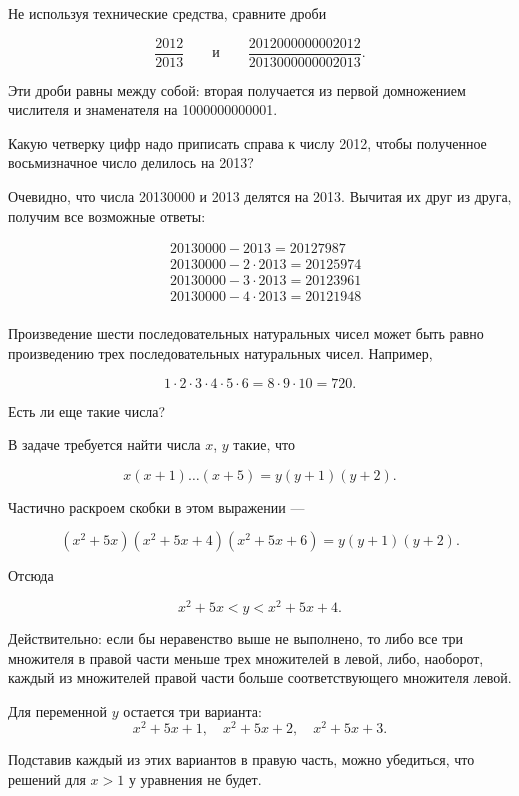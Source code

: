 \begin{itemize}

\itA Не используя технические средства, сравните дроби

$$
\frac{2012}{2013}\qquad\text{и}\qquad\frac{2012000000002012}{2013000000002013}.
$$

\itr Эти дроби равны между собой: вторая получается из первой домножением числителя и знаменателя на 1000000000001.

\bigbreak\noindent

\end{itemize}


\begin{itemize}

\itA Какую четверку цифр надо приписать справа к числу 2012, чтобы полученное восьмизначное число делилось на 2013?

\itr Очевидно, что числа 20130000 и 2013 делятся на 2013. Вычитая их друг из друга, получим все возможные ответы:

\begin{align*}
	& 20130000 - 2013 = 20127987 \\
	& 20130000 - 2 \cdot 2013 = 20125974 \\
	& 20130000 - 3 \cdot 2013 = 20123961 \\
	& 20130000 - 4 \cdot 2013 = 20121948 \\
\end{align*}

\itC Произведение шести последовательных натуральных чисел может быть равно произведению трех последовательных натуральных чисел. Например,

$$1\cdot 2\cdot 3\cdot 4\cdot 5\cdot 6=8\cdot 9\cdot 10=720.$$

Есть ли еще такие числа?

\itr В задаче требуется найти числа $x$, $y$ такие, что

\vspace{-0.4cm}
$$x(x+1)\ldots(x+5) = y(y+1)(y+2).$$

Частично раскроем скобки в этом выражении — 

\vspace{-0.4cm}
$$(x^2 + 5x)(x^2 + 5x + 4)(x^2 + 5x + 6) = y(y + 1)(y + 2).$$

Отсюда

\vspace{-0.4cm}
$$x^2+5x<y<x^2+5x+4.$$

Действительно: если бы неравенство выше не выполнено, то либо все три множителя в правой части меньше трех множителей в левой, либо, наоборот, каждый из множителей правой части больше соответствующего множителя левой.

Для переменной $y$ остается три варианта:
	$$x^2+5x+1,\quad x^2+5x+2,\quad x^2+5x+3.$$

Подставив каждый из этих вариантов в правую часть, можно убедиться, что решений для $x>1$ у уравнения не будет.

\end{itemize}

